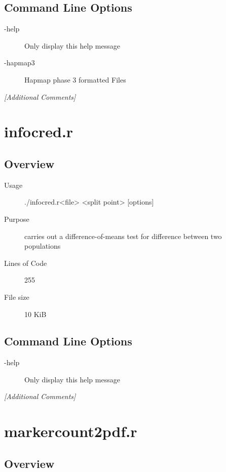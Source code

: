 \subsection{Command Line Options}
\label{sec:icdiff.r-command-line}

\begin{description}
\item[-help] Only display this help message
\item[-hapmap3] Hapmap phase 3 formatted Files
\end{description}

\emph{[Additional Comments]}

\section{infocred.r}
\label{sec:infocred.r}

\subsection{Overview}
\label{sec:infocred.r-overview}

\begin{description}
\item[Usage] ./infocred.r<file> <split point> [options]
\item[Purpose] carries out a difference-of-means test for difference between two populations
\item[Lines of Code] 255
\item[File size] 10 KiB
\end{description}

\subsection{Command Line Options}
\label{sec:infocred.r-command-line}

\begin{description}
\item[-help] Only display this help message
\end{description}

\emph{[Additional Comments]}

\section{markercount2pdf.r}
\label{sec:markercount2pdf.r}

\subsection{Overview}
\label{sec:markercount2pdf.r-overview}

